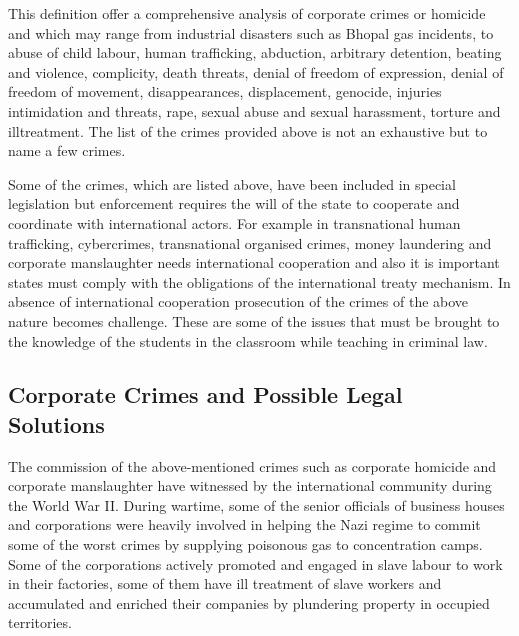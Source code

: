 \begin{multicols}{2}
\vspace{-.5cm}

\noi
This definition offer a comprehensive analysis of corporate crimes or homicide and
which may range from industrial disasters such as Bhopal gas incidents, to abuse
of child labour, human trafficking, abduction, arbitrary detention, beating and
violence, complicity, death threats, denial of freedom of expression, denial of
freedom of movement, disappearances, displacement, genocide, injuries
intimidation and threats, rape, sexual abuse and sexual harassment, torture and illtreatment. The list of the crimes provided above is not an exhaustive but to name a
few crimes.

\noi
Some of the crimes, which are listed above, have been included in special
legislation but enforcement requires the will of the state to cooperate and
coordinate with international actors. For example in transnational human
trafficking, cybercrimes, transnational organised crimes, money laundering and
corporate manslaughter needs international cooperation and also it is important
states must comply with the obligations of the international treaty mechanism. In
absence of international cooperation prosecution of the crimes of the above nature
becomes challenge. These are some of the issues that must be brought to the
knowledge of the students in the classroom while teaching in criminal law.

\vspace{-.5cm}

\subsection{Corporate Crimes and Possible Legal\\ Solutions}\label{subsection-3.2}

\vspace{-.3cm}

\noi
The commission of the above-mentioned crimes such as corporate homicide and
corporate manslaughter have witnessed by the international community during the
World War II. During wartime, some of the senior officials of business houses and
corporations were heavily involved in helping the Nazi regime to commit some of
the worst crimes by supplying poisonous gas to concentration camps. Some of the
corporations actively promoted and engaged in slave labour to work in their
factories, some of them have ill treatment of slave workers and accumulated and
enriched their companies by plundering property in occupied territories.


\end{multicols}
